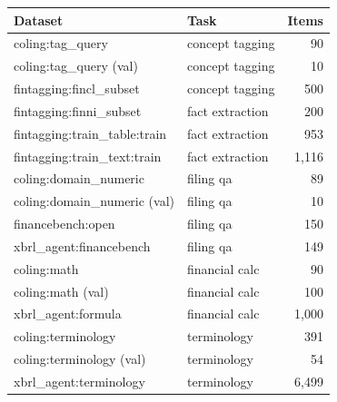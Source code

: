\begin{tabular}{llr}
\toprule
Dataset & Task & Items \\
\midrule
coling:tag\_query & concept tagging & 90 \\
coling:tag\_query (val) & concept tagging & 10 \\
fintagging:fincl\_subset & concept tagging & 500 \\
fintagging:finni\_subset & fact extraction & 200 \\
fintagging:train\_table:train & fact extraction & 953 \\
fintagging:train\_text:train & fact extraction & 1{,}116 \\
coling:domain\_numeric & filing qa & 89 \\
coling:domain\_numeric (val) & filing qa & 10 \\
financebench:open & filing qa & 150 \\
xbrl\_agent:financebench & filing qa & 149 \\
coling:math & financial calc & 90 \\
coling:math (val) & financial calc & 100 \\
xbrl\_agent:formula & financial calc & 1{,}000 \\
coling:terminology & terminology & 391 \\
coling:terminology (val) & terminology & 54 \\
xbrl\_agent:terminology & terminology & 6{,}499 \\
\bottomrule
\end{tabular}
